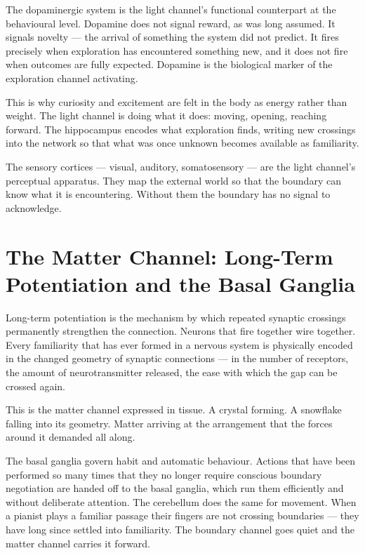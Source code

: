 \documentclass[12pt]{article}
\begin{document}
The dopaminergic system is the light channel's functional counterpart at the
behavioural level. Dopamine does not signal reward, as was long assumed. It
signals novelty --- the arrival of something the system did not predict. It fires
precisely when exploration has encountered something new, and it does not fire
when outcomes are fully expected. Dopamine is the biological marker of the
exploration channel activating.

This is why curiosity and excitement are felt in the body as energy rather than
weight. The light channel is doing what it does: moving, opening, reaching
forward. The hippocampus encodes what exploration finds, writing new crossings
into the network so that what was once unknown becomes available as familiarity.

The sensory cortices --- visual, auditory, somatosensory --- are the light
channel's perceptual apparatus. They map the external world so that the boundary
can know what it is encountering. Without them the boundary has no signal to
acknowledge.

\section{The Matter Channel: Long-Term Potentiation and the Basal Ganglia}

Long-term potentiation is the mechanism by which repeated synaptic crossings
permanently strengthen the connection. Neurons that fire together wire together.
Every familiarity that has ever formed in a nervous system is physically encoded
in the changed geometry of synaptic connections --- in the number of receptors,
the amount of neurotransmitter released, the ease with which the gap can be
crossed again.

This is the matter channel expressed in tissue. A crystal forming. A snowflake
falling into its geometry. Matter arriving at the arrangement that the forces
around it demanded all along.

The basal ganglia govern habit and automatic behaviour. Actions that have been
performed so many times that they no longer require conscious boundary
negotiation are handed off to the basal ganglia, which run them efficiently and
without deliberate attention. The cerebellum does the same for movement. When a
pianist plays a familiar passage their fingers are not crossing boundaries ---
they have long since settled into familiarity. The boundary channel goes quiet
and the matter channel carries it forward.
\end{document}
